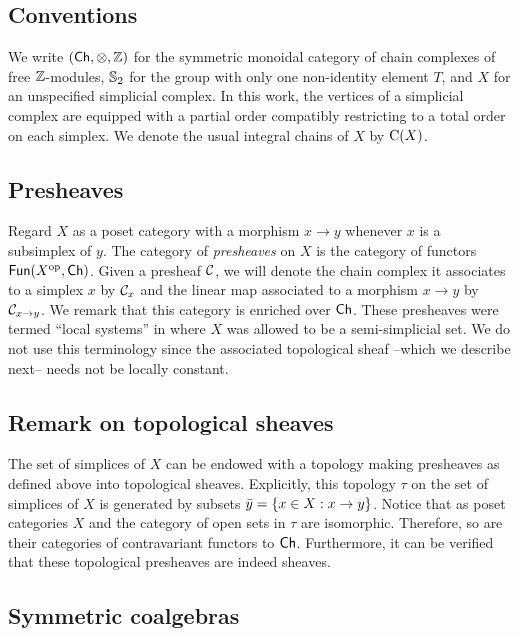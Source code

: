 
\subsection{Conventions}

We write $(\mathsf{Ch}, \otimes, \mathbb{Z})$ for the symmetric monoidal category of chain complexes of free $\mathbb{Z}$-modules, $\mathbb{S}_2$ for the group with only one non-identity element $T$, and $X$ for an unspecified simplicial complex.
In this work, the vertices of a simplicial complex are equipped with a partial order compatibly restricting to a total order on each simplex.
We denote the usual integral chains of $X$ by $\operatorname{C}(X)$.

\subsection{Presheaves} \label{ss:presheaves}

Regard $X$ as a poset category with a morphism $x \to y$ whenever $x$ is a subsimplex of $y$.
The category of \textit{presheaves} on $X$ is the category of functors $\mathsf{Fun}(X^{\mathrm{op}}, \mathsf{Ch})$.
Given a presheaf $\mathcal{C}$, we will denote the chain complex it associates to a simplex $x$ by $\mathcal{C}_x$ and the linear map associated to a morphism $x \to y$ by $\mathcal{C}_{x \to y}$.
We remark that this category is enriched over $\mathsf{Ch}$.
These presheaves were termed ``local systems'' in \cite{ranicki1990assembly} where $X$ was allowed to be a semi-simplicial set.
We do not use this terminology since the associated topological sheaf --which we describe next-- needs not be locally constant.

\subsection{Remark on topological sheaves} \label{ss:topological sheaf}

The set of simplices of $X$ can be endowed with a topology making presheaves as defined above into topological sheaves.
Explicitly, this topology $\tau$ on the set of simplices of $X$ is generated by subsets $\bar y = \{x \in X : x \to y\}$.
Notice that as poset categories $X$ and the category of open sets in $\tau$ are isomorphic.
Therefore, so are their categories of contravariant functors to $\mathsf{Ch}$.
Furthermore, it can be verified that these topological presheaves are indeed sheaves.

\subsection{Symmetric coalgebras}

